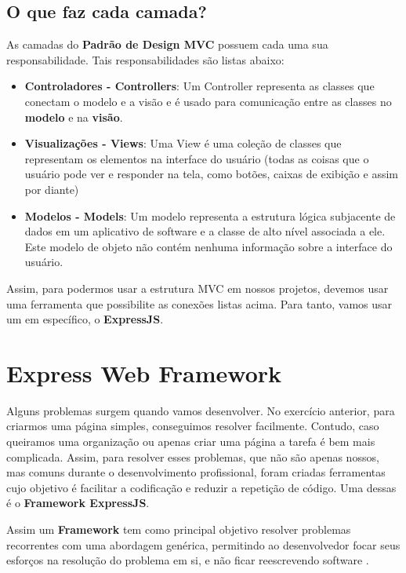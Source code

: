 \subsection{O que faz cada camada?}

As camadas do \textbf{Padrão de Design MVC} possuem cada uma sua responsabilidade. Tais responsabilidades são listas abaixo:

\begin{itemize}[leftmargin=1.7cm]
	\setlength\itemsep{0em}
	\item \textbf{Controladores - Controllers}: Um Controller representa as classes que conectam o modelo e a visão e é usado para comunicação entre as classes no \textbf{modelo} e na \textbf{visão}.
	\item \textbf{Visualizações - Views}: Uma View é uma coleção de classes que representam os elementos na interface do usuário (todas as coisas que o usuário pode ver e responder na tela, como botões, caixas de exibição e assim por diante)
	\item \textbf{Modelos - Models}: Um modelo representa a estrutura lógica subjacente de dados em um aplicativo de software e a classe de alto nível associada a ele. Este modelo de objeto não contém nenhuma informação sobre a interface do usuário.
\end{itemize}

Assim, para podermos usar a estrutura MVC em nossos projetos, devemos usar uma ferramenta que possibilite as conexões listas acima. Para tanto, vamos usar um em específico, o \textbf{ExpressJS}.

\section{Express Web Framework}

Alguns problemas surgem quando vamos desenvolver. No exercício anterior, para criarmos uma página simples, conseguimos resolver facilmente. Contudo, caso queiramos uma organização ou apenas criar uma página a tarefa é bem mais complicada. Assim, para resolver esses problemas, que não são apenas nossos, mas comuns durante o desenvolvimento profissional, foram criadas ferramentas cujo objetivo é facilitar a codificação e reduzir a repetição de código. Uma dessas é o \textbf{Framework ExpressJS}. 

\begin{citacao}
	Assim um \textbf{Framework} tem como principal objetivo resolver problemas recorrentes com uma abordagem genérica, permitindo ao desenvolvedor focar seus esforços na resolução do problema em si, e não ficar reescrevendo software \cite{mozzila}. 
\end{citacao}

